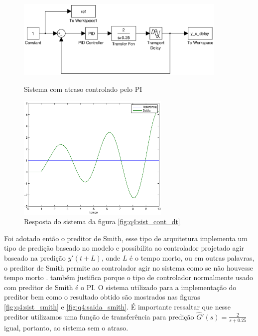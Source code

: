 \begin{figure}[htb]
\centering
\includegraphics[width=0.9\textwidth]{imgs/questao4/sist_cont_dt}
\caption{Sistema com atraso controlado pelo PI}
\label{fig:q4:sist_cont_dt}
\includegraphics[width=0.65\textwidth]{imgs/questao4/saida_cont_dt}
\caption{Resposta do sistema da figura \ref{fig:q4:sist_cont_dt}}
\label{fig:q4:saida_cont_dt}
\end{figure}

Foi adotado então o preditor de Smith, esse tipo de arquitetura implementa um tipo
de predição baseado no modelo e possibilita ao controlador projetado agir
baseado na predição $y'(t + L)$, onde $L$ é o tempo morto, ou em outras
palavras, o preditor de Smith permite ao controlador agir no sistema como se não
houvesse tempo morto \cite{Haegglund1996}. 
também justifica porque o tipo de controlador normalmente usado com preditor de
Smith é o PI. O sistema utilizado para a implementação do preditor bem como o
resultado obtido são mostrados nas figuras \ref{fig:q4:sist_smith} e
\ref{fig:q4:saida_smith}. É importante ressaltar que nesse preditor utilizamos
uma função de transferência para predição $\hat{G}'(s) = \frac{2}{s+0.25}$ igual,
portanto, ao sistema sem o atraso.

